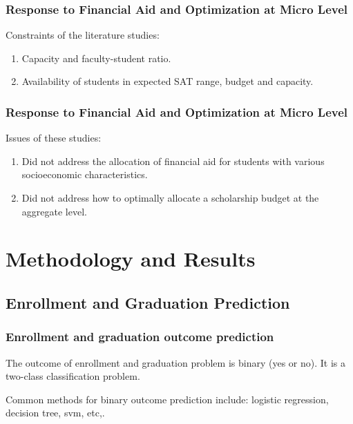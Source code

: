\documentclass{beamer}
\begin{document}
\begin{frame}
    \frametitle{Response to Financial Aid and Optimization at Micro Level}
    Constraints of the literature studies:
    \begin{enumerate}
    \item Capacity and faculty-student ratio. 
    \citep{Thanh2007}
    
    \item Availability of students in expected SAT range, 
    budget and capacity. 
    \citep{Sugrue2010}
    
    \end{enumerate}
\end{frame}


\begin{frame}
   \frametitle{Response to Financial Aid and Optimization at Micro Level}
 
 Issues of these studies:
 
 \begin{enumerate}
 \item Did not address the allocation of financial aid for students with various socioeconomic characteristics.
 \item Did not address how to optimally allocate a scholarship budget at the aggregate level.
 \end{enumerate}

\end{frame}


\section{Methodology and Results}
\subsection{Enrollment and Graduation Prediction}
\begin{frame}
    \frametitle{Enrollment and graduation outcome prediction}
The outcome of enrollment and graduation problem is binary (yes or no). 
It is a two-class classification problem.

Common methods for binary outcome prediction include: logistic regression, decision tree, svm, etc,. 
\end{frame}
\end{document}

